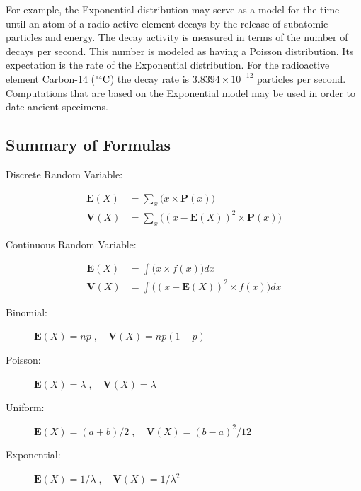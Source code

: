 \documentclass[
]{krantz}
\newcommand{\Expec}{\mathbf{E}}
\newcommand{\Prob}{\mathbf{P}}
\newcommand{\Var}{\mathbf{V}}
\theoremstyle{definition}
\theoremstyle{definition}
\theoremstyle{definition}
\theoremstyle{remark}
\begin{document}
For example, the Exponential distribution may serve as a model for the
time until an atom of a radio active element decays by the release of
subatomic particles and energy. The decay activity is measured in terms
of the number of decays per second. This number is modeled as having a
Poisson distribution. Its expectation is the rate of the Exponential
distribution. For the radioactive element Carbon-14
(\({}^{\mbox{\tiny 14}}\mathrm{C}\)) the decay rate is
\(3.8394 \times 10^{-12}\) particles per second. Computations that are
based on the Exponential model may be used in order to date ancient
specimens.

\hypertarget{summary-of-formulas}{%
\subsection*{Summary of Formulas}\label{summary-of-formulas}}


\begin{description}
\item[Discrete Random Variable:]
\end{description}

\[\begin{aligned}
        \Expec(X) &= \sum_x \big(x \times \Prob(x)\big) \\
        \Var(X) &= \sum_x\big( (x-\Expec(X))^2 \times \Prob(x)\big) \end{aligned}\]

\begin{description}
\item[Continuous Random Variable:]
\end{description}

\[\begin{aligned}
        \Expec(X) &= \int \big(x \times f(x)\big)dx \\
        \Var(X) &= \int\big((x-\Expec(X))^2 \times f(x) \big) dx \end{aligned}\]

\begin{description}
\item[Binomial:]
\(\Expec(X) = n p \;, \quad \Var(X) = n p(1-p)\)
\item[Poisson:]
\(\Expec(X) = \lambda\;, \quad \Var(X) = \lambda\)
\item[Uniform:]
\(\Expec(X) = (a+b)/2\;, \quad \Var(X)= (b-a)^2/12\)
\item[Exponential:]
\(\Expec(X) = 1/\lambda\;, \quad \Var(X)= 1/\lambda^2\)
\end{description}
\end{document}
